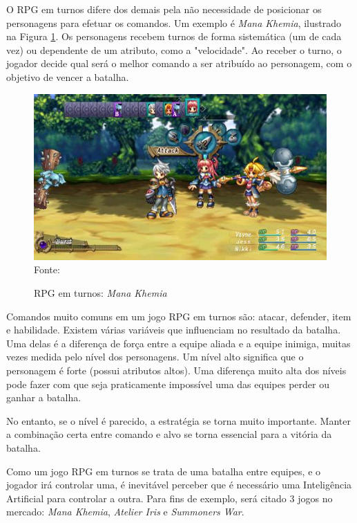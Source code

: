 \documentclass[
	12pt,					%
	openright,				%
	oneside,				%
	a4paper,				%
	bibjustif,				%
	chapter=TITLE,			%
	english,				%
	brazil,					%
	]{abntex2}
\newcommand{\source}[1]{\small Fonte: {#1}}
\begin{document}
		O RPG em turnos difere dos demais pela não necessidade de posicionar os personagens para efetuar os comandos.
		Um exemplo é \textit{Mana Khemia}, ilustrado na Figura \ref{fig:manaKhemia}.
		Os personagens recebem turnos de forma sistemática
		(um de cada vez)
		ou dependente de um atributo,
		como a "velocidade".
		Ao receber o turno, o jogador decide qual será o melhor comando a ser atribuído ao personagem,
		com o objetivo de vencer a batalha.
		
		\begin{figure}[ht!]
			\caption{RPG em turnos: \textit{Mana Khemia}}
			\centering
			\includegraphics[scale=0.55]{img/mana-khemia.jpg}\\
			\vspace{0.5mm}
			\source{}
			\label{fig:manaKhemia}
		\end{figure}
		
		Comandos muito comuns em um jogo RPG em turnos são: atacar, defender, item e habilidade.
		Existem várias variáveis que influenciam no resultado da batalha.
		Uma delas é a diferença de força entre a equipe aliada e a equipe inimiga, muitas vezes medida pelo nível dos personagens.
		Um nível alto significa que o personagem é forte (possui atributos altos).
		Uma diferença muito alta dos níveis pode fazer com que seja praticamente impossível uma das equipes perder ou ganhar a batalha.
		
		No entanto, se o nível é parecido, a estratégia se torna muito importante.
		Manter a combinação certa entre comando e alvo se torna essencial para a vitória da batalha.
		
		Como um jogo RPG em turnos se trata de uma batalha entre equipes, e o jogador irá controlar uma,
		é inevitável perceber que é necessário uma Inteligência Artificial para controlar a outra.
		Para fins de exemplo, será citado 3 jogos no mercado: \textit{Mana Khemia}, \textit{Atelier Iris} e \textit{Summoners War}.
		
\end{document}
